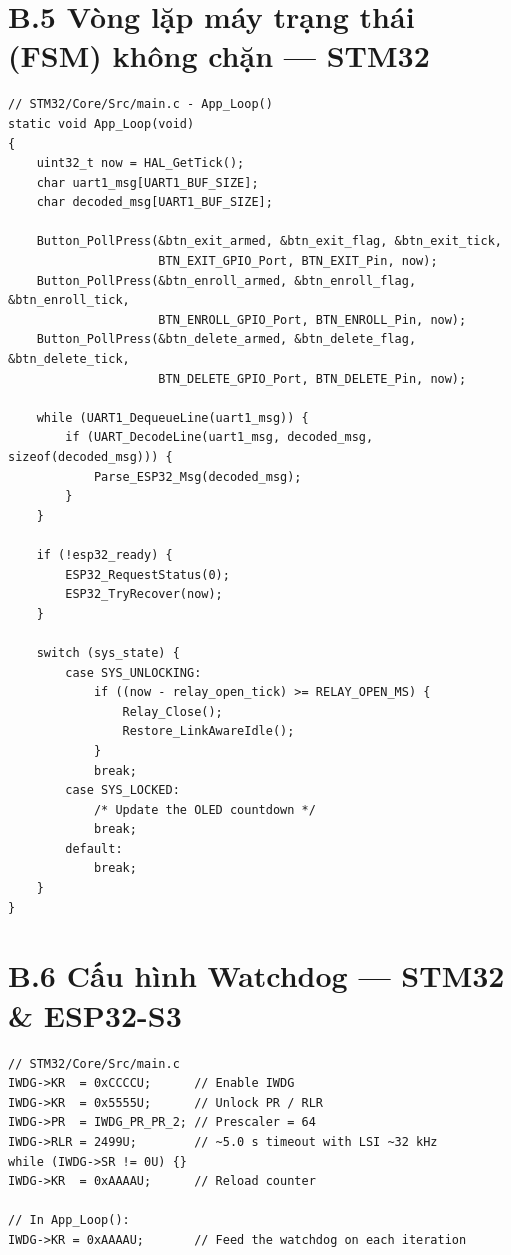 \section*{B.5 \quad Vòng lặp máy trạng thái (FSM) không chặn --- STM32}

\begin{lstlisting}[style=cstyle,
  caption={Main loop FSM xử lý sự kiện không chặn},
  label={lst:fsm_main_loop}]
// STM32/Core/Src/main.c - App_Loop()
static void App_Loop(void)
{
    uint32_t now = HAL_GetTick();
    char uart1_msg[UART1_BUF_SIZE];
    char decoded_msg[UART1_BUF_SIZE];

    Button_PollPress(&btn_exit_armed, &btn_exit_flag, &btn_exit_tick,
                     BTN_EXIT_GPIO_Port, BTN_EXIT_Pin, now);
    Button_PollPress(&btn_enroll_armed, &btn_enroll_flag, &btn_enroll_tick,
                     BTN_ENROLL_GPIO_Port, BTN_ENROLL_Pin, now);
    Button_PollPress(&btn_delete_armed, &btn_delete_flag, &btn_delete_tick,
                     BTN_DELETE_GPIO_Port, BTN_DELETE_Pin, now);

    while (UART1_DequeueLine(uart1_msg)) {
        if (UART_DecodeLine(uart1_msg, decoded_msg, sizeof(decoded_msg))) {
            Parse_ESP32_Msg(decoded_msg);
        }
    }

    if (!esp32_ready) {
        ESP32_RequestStatus(0);
        ESP32_TryRecover(now);
    }

    switch (sys_state) {
        case SYS_UNLOCKING:
            if ((now - relay_open_tick) >= RELAY_OPEN_MS) {
                Relay_Close();
                Restore_LinkAwareIdle();
            }
            break;
        case SYS_LOCKED:
            /* Update the OLED countdown */
            break;
        default:
            break;
    }
}
\end{lstlisting}

\section*{B.6 \quad Cấu hình Watchdog --- STM32 \& ESP32-S3}

\begin{lstlisting}[style=cstyle,
  caption={Independent Watchdog (IWDG) STM32F411 - ~5s timeout},
  label={lst:iwdg_config}]
// STM32/Core/Src/main.c
IWDG->KR  = 0xCCCCU;      // Enable IWDG
IWDG->KR  = 0x5555U;      // Unlock PR / RLR
IWDG->PR  = IWDG_PR_PR_2; // Prescaler = 64
IWDG->RLR = 2499U;        // ~5.0 s timeout with LSI ~32 kHz
while (IWDG->SR != 0U) {}
IWDG->KR  = 0xAAAAU;      // Reload counter

// In App_Loop():
IWDG->KR = 0xAAAAU;       // Feed the watchdog on each iteration
\end{lstlisting}

